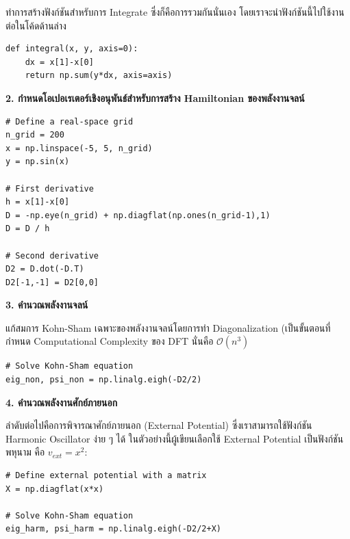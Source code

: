\vspace{1em}

ทำการสร้างฟังก์ชันสำหรับการ Integrate ซึ่งก็คือการรวมกันนั่นเอง โดยเราจะนำฟังก์ชันนี้ไปใช้งานต่อในโค้ดด้านล่าง

\begin{lstlisting}[style=MyPython]
def integral(x, y, axis=0):
    dx = x[1]-x[0]
    return np.sum(y*dx, axis=axis)
\end{lstlisting}

\vspace{1em}

\noindent \textbf{2. กำหนดโอเปอเรเตอร์เชิงอนุพันธ์สำหรับการสร้าง Hamiltonian ของพลังงานจลน์}

\begin{lstlisting}[style=MyPython]
# Define a real-space grid
n_grid = 200
x = np.linspace(-5, 5, n_grid)
y = np.sin(x)

# First derivative
h = x[1]-x[0]
D = -np.eye(n_grid) + np.diagflat(np.ones(n_grid-1),1)
D = D / h

# Second derivative
D2 = D.dot(-D.T)
D2[-1,-1] = D2[0,0]
\end{lstlisting}

\vspace{1em}

\noindent \textbf{3. คำนวณพลังงานจลน์}

แก้สมการ Kohn-Sham เฉพาะของพลังงานจลน์โดยการทำ Diagonalization (เป็นขั้นตอนที่กำหนด Computational Complexity ของ DFT นั่นคือ $\mathcal{O}(n^{3})$

\begin{lstlisting}[style=MyPython]
# Solve Kohn-Sham equation
eig_non, psi_non = np.linalg.eigh(-D2/2)
\end{lstlisting}

\vspace{1em}

\noindent \textbf{4. คำนวณพลังงานศักย์ภายนอก}

ลำดับต่อไปคือการพิจารณาศักย์ภายนอก (External Potential) ซึ่งเราสามารถใช้ฟังก์ชัน Harmonic Oscillator ง่าย ๆ ได้ ในตัวอย่างนี้ผู้เขียนเลือกใช้ External Potential เป็นฟังก์ชันพหุนาม คือ $v_{ext}=x^2$:

\begin{lstlisting}[style=MyPython]
# Define external potential with a matrix
X = np.diagflat(x*x)

# Solve Kohn-Sham equation
eig_harm, psi_harm = np.linalg.eigh(-D2/2+X)
\end{lstlisting}

\vspace{1em}

